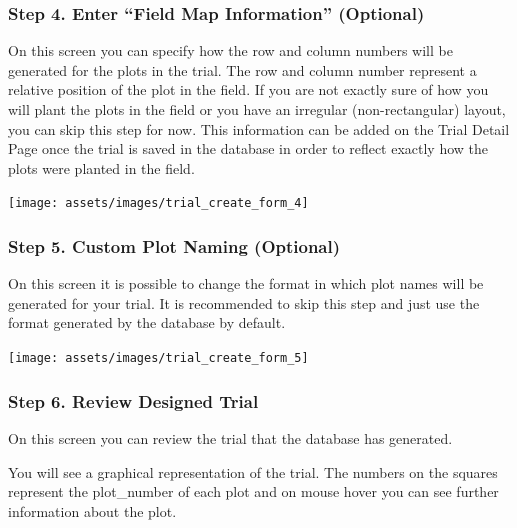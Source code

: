 \documentclass[
  12pt,
]{book}
\begin{document}
\hypertarget{step-4.-enter-field-map-information-optional}{%
\subsubsection*{Step 4. Enter ``Field Map Information'' (Optional)}\label{step-4.-enter-field-map-information-optional}}


On this screen you can specify how the row and column numbers will be generated for the plots in the trial. The row and column number represent a relative position of the plot in the field. If you are not exactly sure of how you will plant the plots in the field or you have an irregular (non-rectangular) layout, you can skip this step for now. This information can be added on the Trial Detail Page once the trial is saved in the database in order to reflect exactly how the plots were planted in the field.

\begin{center}\texttt{[image: assets/images/trial\_create\_form\_4]} \end{center}

\hypertarget{step-5.-custom-plot-naming-optional}{%
\subsubsection*{Step 5. Custom Plot Naming (Optional)}\label{step-5.-custom-plot-naming-optional}}


On this screen it is possible to change the format in which plot names will be generated for your trial. It is recommended to skip this step and just use the format generated by the database by default.

\begin{center}\texttt{[image: assets/images/trial\_create\_form\_5]} \end{center}

\hypertarget{step-6.-review-designed-trial}{%
\subsubsection*{Step 6. Review Designed Trial}\label{step-6.-review-designed-trial}}


On this screen you can review the trial that the database has generated.

You will see a graphical representation of the trial. The numbers on the squares represent the plot\_number of each plot and on mouse hover you can see further information about the plot.
\end{document}
